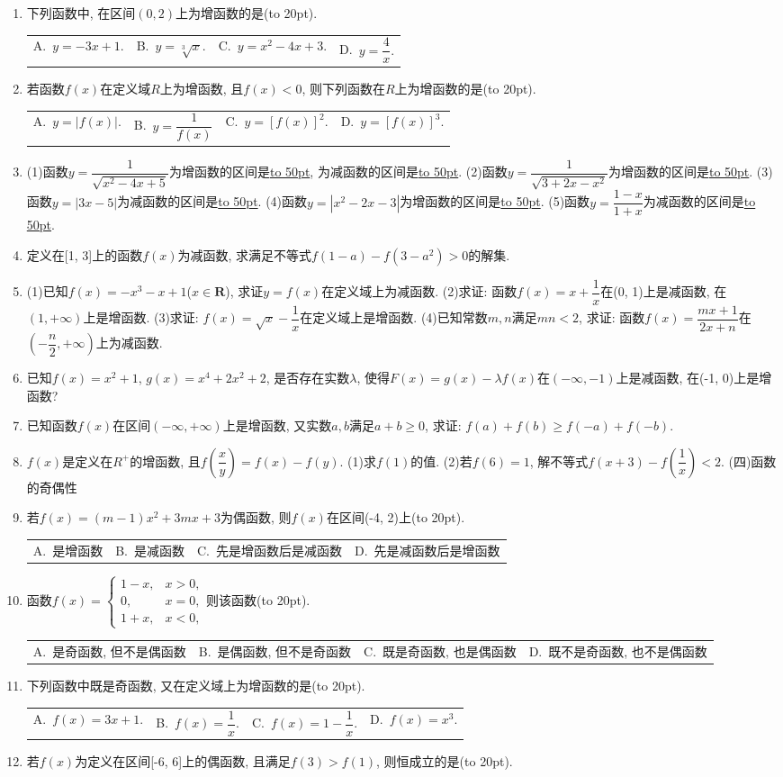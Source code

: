 \documentclass[10pt,a4paper]{article}
\newcommand{\blank}[1]{\underline{\hbox to #1pt{}}}
\newcommand{\bracket}[1]{(\hbox to #1pt{})}
\newcommand{\fourch}[4]{\par\begin{tabular}{p{.23\textwidth}p{.23\textwidth}p{.23\textwidth}p{.23\textwidth}}
A.~#1 &B.~#2& C.~#3& D.~#4
\end{tabular}}
\begin{document}
\begin{enumerate}[1.]
\fourch{$a\le -2.$}{$a\ge -2.$}{$a\le -6.$}{$a\ge -6.$}
\item 下列函数中, 在区间$(0,2)$上为增函数的是\bracket{20}.
\fourch{$y=-3x+1.$}{$y=\sqrt[3]x.$}{$y=x^2-4x+3.$}{$y=\dfrac 4x.$}
\item 若函数$f(x)$在定义域$R$上为增函数, 且$f(x)<0$, 则下列函数在$R$上为增函数的是\bracket{20}.
\fourch{$y=|f(x)|.$}{$y=\dfrac 1{f(x)}$}{$y=[ f(x) ]^2.$}{$y=[ f(x) ]^3.$}
\item (1)函数$y=\dfrac 1{\sqrt {x^2-4x+5}}$为增函数的区间是\blank{50}, 为减函数的区间是\blank{50}.
(2)函数$y=\dfrac 1{\sqrt {3+2x-x^2}}$为增函数的区间是\blank{50}.
(3)函数$y=|3x-5|$为减函数的区间是\blank{50}.
(4)函数$y=|x^2-2x-3|$为增函数的区间是\blank{50}.
(5)函数$y=\dfrac{1-x}{1+x}$为减函数的区间是\blank{50}.
\item 定义在[1, 3]上的函数$f(x)$为减函数, 求满足不等式$f(1-a)-f(3-a^2)>0$的解集.
\item (1)已知$f(x)=-x^3-x+1$($x\in \mathbf{R}$), 求证$y=f(x)$在定义域上为减函数.
(2)求证: 函数$f(x)=x+\dfrac 1x$在(0, 1)上是减函数, 在$(1,+\infty)$上是增函数.
(3)求证: $f(x)=\sqrt x-\dfrac 1x$在定义域上是增函数.
(4)已知常数$m,n$满足$mn<2$, 求证: 函数$f(x)=\dfrac{mx+1}{2x+n}$在$(-\dfrac n2,+\infty)$上为减函数.
\item 已知$f(x)=x^2+1$, $g(x)=x^4+2x^2+2$, 是否存在实数$\lambda$, 使得$F(x)=g(x)-\lambda f(x)$在$(-\infty ,-1)$上是减函数, 在(-1, 0)上是增函数?
\item 已知函数$f(x)$在区间$(-\infty ,+\infty)$上是增函数, 又实数$a,b$满足$a+b\ge 0$, 求证: $f(a)+f(b)\ge f(-a)+f(-b)$.
\item $f(x)$是定义在$R^+$的增函数, 且$f(\dfrac xy)=f(x)-f(y)$.
(1)求$f(1)$的值.
(2)若$f(6)=1$, 解不等式$f(x+3)-f(\dfrac 1x)<2$.
(四)函数的奇偶性
\item 若$f(x)=(m-1)x^2+3mx+3$为偶函数, 则$f(x)$在区间(-4, 2)上\bracket{20}.
\fourch{是增函数}{是减函数}{先是增函数后是减函数}{先是减函数后是增函数}
\item 函数$f(x)=\begin{cases}   1-x, & x>0,  \\ 0, & x=0,  \\1+x, & x<0,  \end{cases}$则该函数\bracket{20}.
\fourch{是奇函数, 但不是偶函数}{是偶函数, 但不是奇函数}{既是奇函数, 也是偶函数}{既不是奇函数, 也不是偶函数}
\item 下列函数中既是奇函数, 又在定义域上为增函数的是\bracket{20}.
\fourch{$f(x)=3x+1.$}{$f(x)=\dfrac 1x.$}{$f(x)=1-\dfrac 1x.$}{$f(x)=x^3.$}
\item 若$f(x)$为定义在区间[-6, 6]上的偶函数, 且满足$f(3)>f(1)$, 则恒成立的是\bracket{20}.

\end{enumerate}
\end{document}
